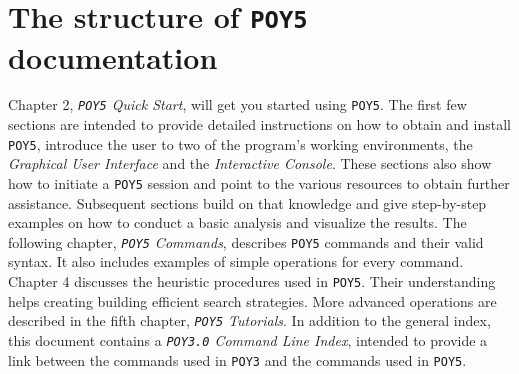 \documentclass[11pt]{book}
\newcommand{\commandstyle}[1]{\texttt{#1}}
\newcommand{\poy}{\commandstyle{POY5}\xspace}
\begin{document}
\section{The structure of \poy documentation}
Chapter 2, \emph{\poy Quick Start}, will get you started using \poy. The first few sections are intended to provide detailed 
instructions on how to obtain and install \poy, introduce the user to two of the program's working environments, the 
\emph{Graphical User Interface} and the \emph{Interactive Console}. These sections also show how to initiate a \poy 
session and point to the various resources to obtain further assistance. Subsequent sections build on that knowledge and 
give step-by-step examples on how to conduct a basic analysis and visualize the results. The following chapter, 
\emph{\poy Commands}, describes \poy commands and their valid syntax. It also includes examples of simple operations 
for every command. Chapter 4 discusses the heuristic procedures used in \poy. Their understanding helps creating building 
efficient search strategies. More advanced operations are described in the fifth chapter, \emph{\poy Tutorials}. In addition 
to the general index, this document contains a \emph{\texttt{POY3.0} Command Line Index}, intended to provide a link 
between the commands used in \texttt{POY3} and the commands used in \poy. 
\end{document}
